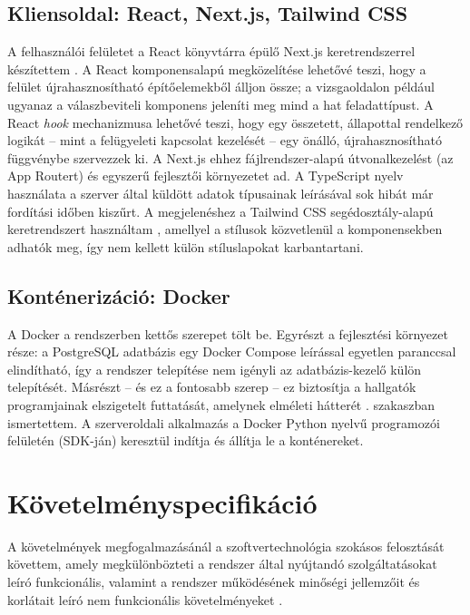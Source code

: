 \subsection{Kliensoldal: React, Next.js, Tailwind CSS}

A felhasználói felületet a React könyvtárra épülő Next.js keretrendszerrel készítettem
\cite{react_docs,nextjs_docs}. A React komponensalapú megközelítése lehetővé teszi, hogy a felület
újrahasznosítható építőelemekből álljon össze; a vizsgaoldalon például ugyanaz a válaszbeviteli
komponens jeleníti meg mind a hat feladattípust. A React \textit{hook} mechanizmusa lehetővé teszi,
hogy egy összetett, állapottal rendelkező logikát -- mint a felügyeleti kapcsolat kezelését --
egy önálló, újrahasznosítható függvénybe szervezzek ki. A Next.js ehhez fájlrendszer-alapú
útvonalkezelést (az App Routert) és egyszerű fejlesztői környezetet ad. A TypeScript nyelv
használata a szerver által küldött adatok típusainak leírásával sok hibát már fordítási időben
kiszűrt. A megjelenéshez a Tailwind CSS segédosztály-alapú keretrendszert használtam
\cite{tailwind_docs}, amellyel a stílusok közvetlenül a komponensekben adhatók meg, így nem kellett
külön stíluslapokat karbantartani.

\subsection{Konténerizáció: Docker}

A Docker \cite{merkel2014docker,docker_docs} a rendszerben kettős szerepet tölt be. Egyrészt a
fejlesztési környezet része: a PostgreSQL adatbázis egy Docker Compose leírással egyetlen
paranccsal elindítható, így a rendszer telepítése nem igényli az adatbázis-kezelő külön
telepítését. Másrészt -- és ez a fontosabb szerep -- ez biztosítja a hallgatók programjainak
elszigetelt futtatását, amelynek elméleti hátterét . szakaszban
ismertettem. A szerveroldali alkalmazás a Docker Python nyelvű programozói felületén
(SDK-ján) keresztül indítja és állítja le a konténereket.

\section{Követelményspecifikáció}
\label{sec:kovetelmenyek}

A követelmények megfogalmazásánál a szoftvertechnológia szokásos felosztását követtem, amely
megkülönbözteti a rendszer által nyújtandó szolgáltatásokat leíró funkcionális, valamint a
rendszer működésének minőségi jellemzőit és korlátait leíró nem funkcionális követelményeket
\cite{sommerville2016software}.

